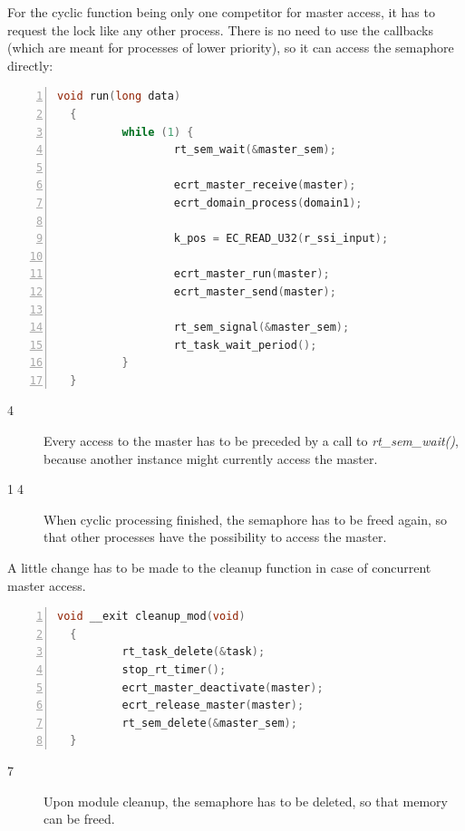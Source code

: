 \documentclass[a4paper,12pt,BCOR6mm,bibtotoc,idxtotoc]{scrbook}
\newcommand{\linenum}[1]{\normalfont\textcircled{\tiny #1}}
\begin{document}
For the cyclic function being only one competitor for master access,
it has to request the lock like any other process. There is no need to
use the callbacks (which are meant for processes of lower priority),
so it can access the semaphore directly:

\begin{lstlisting}[gobble=2,language=C,numbers=left,caption={RTAI cyclic
    function for concurrent access},label={lst:conrun}]
  void run(long data)
  {
          while (1) {
                  rt_sem_wait(&master_sem);

                  ecrt_master_receive(master);
                  ecrt_domain_process(domain1);

                  k_pos = EC_READ_U32(r_ssi_input);

                  ecrt_master_run(master);
                  ecrt_master_send(master);

                  rt_sem_signal(&master_sem);
                  rt_task_wait_period();
          }
  }
\end{lstlisting}

\begin{description}

\item[\linenum{4}] Every access to the master has to be preceded by a call to
\textit{rt\_sem\_wait()}, because another instance might currently access the
master.

\item[\linenum{14}] When cyclic processing finished, the semaphore has to be
freed again, so that other processes have the possibility to access the master.

\end{description}

A little change has to be made to the cleanup function in case of
concurrent master access.

\begin{lstlisting}[gobble=2,language=C,numbers=left,caption={RTAI module
    cleanup function for concurrent access},label={lst:conclean}]
  void __exit cleanup_mod(void)
  {
          rt_task_delete(&task);
          stop_rt_timer();
          ecrt_master_deactivate(master);
          ecrt_release_master(master);
          rt_sem_delete(&master_sem);
  }
\end{lstlisting}

\begin{description}
\item[\linenum{7}] Upon module cleanup, the
  semaphore has to be deleted, so that memory can be freed.
\end{description}
\end{document}
